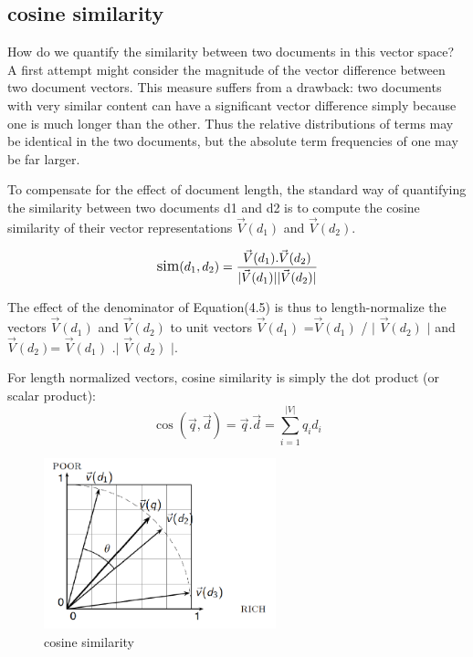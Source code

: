 \subsection{cosine similarity}

How do we quantify the similarity between two documents in this vector
space? A first attempt might consider the magnitude of the vector difference
between two document vectors.
This measure suffers from a drawback: two documents with very similar content can have a significant vector difference simply because one is much longer than the other. Thus the relative distributions of terms may be identical in the two documents, but the absolute term frequencies of one may be far larger.

To compensate for the effect of document length, the standard way of
quantifying the similarity between two documents d1 and d2 is to compute
the cosine similarity of their vector representations 
$\vec{V}(d_1)$ and $\vec{V}(d_2)$.

\begin{equation}
    \large
         \text{sim}(d_1 ,d_2) \\
         =\frac{\vec{V}( d_1 ) . \vec{V}( d_2 ) } {|\vec{V}( d_1 )| |\vec{V}( d_2 )|}
\end{equation}


The effect of the denominator of Equation(4.5) is thus to length-normalize the vectors $\vec{V}(d_1)$ and $\vec{V}(d_2)$ 
to unit vectors  $\vec{V}(d_1)$  =$\vec{V}(d_1)$  / $|$ $\vec{V}(d_2)$ $|$ and  $\vec{V}(d_2)$= $\vec{V}(d_1)$ .$|$ $\vec{V}(d_2)$ $|$. 

For length normalized vectors, cosine similarity is simply the dot product (or scalar product):
\begin{equation}
    \cos{(\vec{q},\vec{d})} = \vec{q} .\vec{d} =\sum_{i=1}^{|V|} q_{i}  d_{i}
\end{equation}
\begin{figure}[H]%
    \center%
    \includegraphics[width=0.6\textwidth]{images/shimaa/cosine similarity.png}
    \caption[cosine similarity]{cosine similarity}\label{fig:cosine similarity}%
\end{figure}

